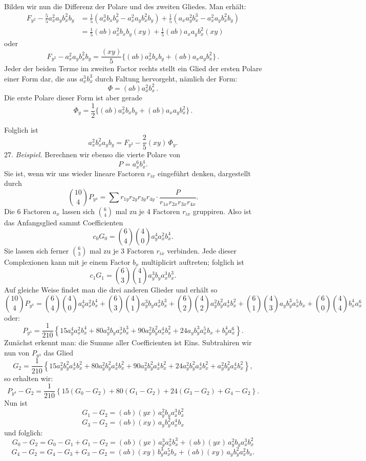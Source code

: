 Bilden wir nun die Differenz der Polare und des zweiten Gliedes. Man erhält:
\[
\begin{aligned}
F_{y^2}-\frac{5}{5}a_x^2a_yb_x^2b_y &=\frac{1}{5}(a_x^3b_xb_y^2-a_x^2a_yb_x^2b_y)+\frac{1}{5}(a_xa_y^2b_x^3-a_x^2a_yb_x^2b_y)\\
&=\frac{1}{5}(ab)a_x^2b_xb_y(xy)+\frac{1}{5}(ab)a_xa_yb_x^2(xy)
\end{aligned}
\]
oder
\[
F_{y^2}-a_x^2a_yb_x^2b_y=\frac{(xy)}{5}\Big\{(ab)a_x^2b_xb_y+(ab)a_xa_yb_x^2\Big\}\,.
\]
Jeder der beiden Terme im zweiten Factor rechts stellt ein Glied der ersten Polare einer Form dar, die aus $a_x^3b_x^3$ durch Faltung hervorgeht, nämlich der Form:
\[
\Phi=(ab)a_x^2b_x^2\,.
\]
Die erste Polare dieser Form ist aber gerade
\[
\Phi_y=\frac{1}{2}\Big\{(ab)a_x^2b_xb_y+(ab)a_xa_yb_x^2\Big\}\,.
\]


Folglich ist
\[
a_x^2 b_x^2 a_y b_y = F_{y^2} - \frac{2}{5} (xy)\, \Phi_y .
\]
27. \textit{Beispiel.} Berechnen wir ebenso die vierte Polare von
\[
P = a_x^6 b_x^4 .
\]
Sie ist, wenn wir uns wieder lineare Factoren $r_{ix}$ eingeführt denken, dargestellt durch
\[
\binom{10}{4} P_{y^4} = \sum r_{1y} r_{2y} r_{3y} r_{4y} \cdot \frac{P}{r_{1x} r_{2x} r_{3x} r_{4x}} .
\]
Die 6 Factoren $a_x$ lassen sich $\binom{6}{4}$ mal zu je 4 Factoren $r_{ix}$ gruppiren.
Also ist das Anfangsglied sammt Coefficienten
\[
c_0 G_0 = \binom{6}{4} \binom{4}{0} a_y^4 a_x^2 b_x^4 .
\]
Sie lassen sich ferner $\binom{6}{3}$ mal zu je 3 Factoren $r_{ix}$ verbinden. Jede dieser Complexionen kann mit je einem Factor $b_x$ multiplicirt auftreten; folglich ist
\[
c_1 G_1 = \binom{6}{3} \binom{4}{1} a_y^3 b_y a_x^3 b_x^3 .
\]
Auf gleiche Weise findet man die drei anderen Glieder und erhält so
\[
\binom{10}{4} P_{y^4} = \binom{6}{4} \binom{4}{0} a_y^4 a_x^2 b_x^4 + \binom{6}{3} \binom{4}{1} a_y^3 b_y a_x^3 b_x^3 + \binom{6}{2} \binom{4}{2} a_y^2 b_y^2 a_x^4 b_x^2 + \binom{6}{1} \binom{4}{3} a_y b_y^3 a_x^5 b_x + \binom{6}{0} \binom{4}{4} b_x^4 a_x^6
\]
oder:
\[
P_{y^4} = \frac{1}{210} \left\{ 15 a_y^4 a_x^2 b_x^4 + 80 a_y^3 b_y a_x^3 b_x^3 + 90 a_y^2 b_y^2 a_x^4 b_x^2 + 24 a_y b_y^3 a_x^5 b_x + b_y^4 a_x^6 \right\} .
\]
Zunächst erkennt man: die Summe aller Coefficienten ist Eins. Subtrahiren wir nun von $P_{y^4}$ das Glied
\[
G_2 = \frac{1}{210} \left\{ 15 a_y^2 b_y^2 a_x^4 b_x^2 + 80 a_y^2 b_y^2 a_x^4 b_x^2 + 90 a_y^2 b_y^2 a_x^4 b_x^2 + 24 a_y^2 b_y^2 a_x^4 b_x^2 + a_y^2 b_y^2 a_x^4 b_x^2 \right\} ,
\]
so erhalten wir:
\[
P_{y^4} - G_2 = \frac{1}{210} \left\{ 15 (G_0 - G_2) + 80 (G_1 - G_2) + 24 (G_3 - G_2) + G_4 - G_2 \right\} .
\]
Nun ist
\[
G_1 - G_2 = (ab)(yx)\, a_y^2 b_y a_x^3 b_x^2
\]
\[
G_3 - G_2 = (ab)(xy)\, a_y b_y^2 a_x^4 b_x
\]
und folglich:
\[
G_0 - G_2 = G_0 - G_1 + G_1 - G_2 = (ab)(yx)\, a_y^3 a_x^2 b_x^3 + (ab)(yx)\, a_y^2 b_y a_x^3 b_x^2
\]
\[
G_4 - G_2 = G_4 - G_3 + G_3 - G_2 = (ab)(xy)\, b_y^3 a_x^5 b_x + (ab)(xy)\, a_y b_y^2 a_x^2 b_x .
\]


